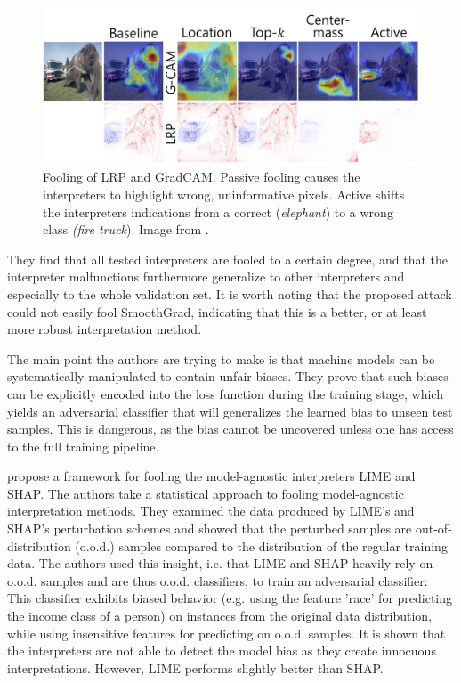 \begin{figure}[ht]
    \centering
    \includegraphics[width=\linewidth]{figures/heo_intro.jpg}
    \caption{Fooling of LRP and GradCAM. Passive fooling causes the interpreters to highlight wrong, uninformative pixels. Active shifts the interpreters indications from a correct (\textit{elephant}) to a wrong class \textit{(fire truck}). Image from \cite{fooling_nn_interpreters}.}
    \label{fig:heo_intro}
    \vspace{-0.3cm}
\end{figure}

 They find that all tested interpreters are fooled to a certain degree, and that the interpreter malfunctions furthermore generalize to other interpreters and especially to the whole validation set. It is worth noting that the proposed attack could not easily fool SmoothGrad, indicating that this is a better, or at least more robust interpretation method. 

The main point the authors are trying to make is that machine models can be systematically manipulated to contain unfair biases. They prove that such biases can be explicitly encoded into the loss function during the training stage, which yields an adversarial classifier that will generalizes the learned bias to unseen test samples. This is dangerous, as the bias cannot be uncovered unless one has access to the full training pipeline. 

\cite{advlime_aies20} propose a framework for fooling the model-agnostic interpreters LIME and SHAP. 
The authors take a statistical approach to fooling model-agnostic interpretation methods. They examined the data produced by LIME's and SHAP's perturbation schemes and showed that the perturbed samples are out-of-distribution (o.o.d.) samples compared to the distribution of the regular training data. The authors used this insight, i.e. that LIME and SHAP heavily rely on o.o.d. samples and are thus o.o.d. classifiers, to train an adversarial classifier: This classifier exhibits biased behavior (e.g. using the feature 'race' for predicting the income class of a person) on instances from the original data distribution, while using insensitive features for predicting on o.o.d. samples. It is shown that the interpreters are not able to detect the model bias as they create innocuous interpretations. However, LIME performs slightly better than SHAP. 

